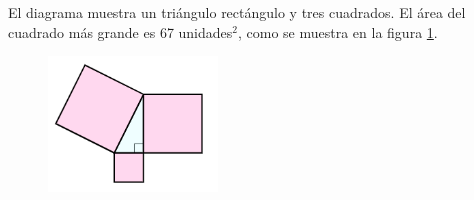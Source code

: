 El diagrama muestra un triángulo rectángulo y tres cuadrados.
El área del cuadrado más grande es 67 unidades$^2$, como se muestra en la figura \ref{fig:area12}.
\begin{figure}[H]
    \begin{center}
        \includegraphics[width=0.4\textwidth]{../images/area12.png}
    \end{center}
    \caption{}
    \label{fig:area12}
\end{figure}

